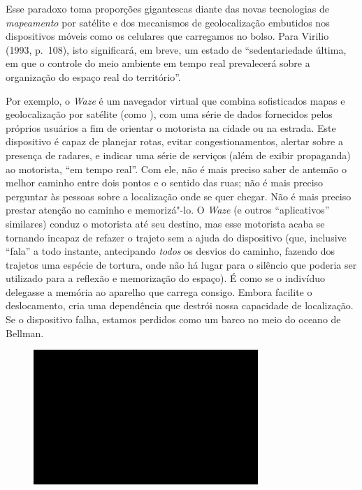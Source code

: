 Esse paradoxo toma proporções gigantescas diante das novas tecnologias
de \emph{mapeamento} por satélite e dos mecanismos de geolocalização
embutidos nos dispositivos móveis como os celulares que carregamos no
bolso. Para Virilio (1993, p.~108), isto significará, em breve, um
estado de ``sedentariedade última, em que o controle do meio ambiente em
tempo real prevalecerá sobre a organização do espaço real do
território''.

Por exemplo, o \emph{Waze} é um navegador virtual que combina sofisticados
mapas e geolocalização por satélite (como ), com uma série de dados
fornecidos pelos próprios usuários a fim de orientar o motorista na
cidade ou na estrada. Este dispositivo é capaz de planejar rotas, evitar
congestionamentos, alertar sobre a presença de radares, e indicar uma
série de serviços (além de exibir propaganda) ao motorista, ``em tempo
real''. Com ele, não é mais preciso saber de antemão o melhor caminho
entre dois pontos e o sentido das ruas; não é mais preciso perguntar às
pessoas sobre a localização onde se quer chegar. Não é mais preciso
prestar atenção no caminho e memorizá"-lo. O \emph{Waze} (e outros
``aplicativos'' similares) conduz o motorista até seu destino, mas esse
motorista acaba se tornando incapaz de refazer o trajeto sem a ajuda do
dispositivo (que, inclusive ``fala'' a todo instante, antecipando
\emph{todos} os desvios do caminho, fazendo dos trajetos uma espécie de
tortura, onde não há lugar para o silêncio que poderia ser utilizado
para a reflexão e memorização do espaço). É como se o indivíduo
delegasse a memória ao aparelho que carrega consigo. Embora facilite o
deslocamento, cria uma dependência que destrói nossa capacidade de
localização. Se o dispositivo falha, estamos perdidos como um barco no
meio do oceano de Bellman.

\begin{figure}[!ht]
\centering
 \includegraphics[width=85mm]{./imgs/im1.jpg}
\caption{\tiny{}}
\end{figure}

